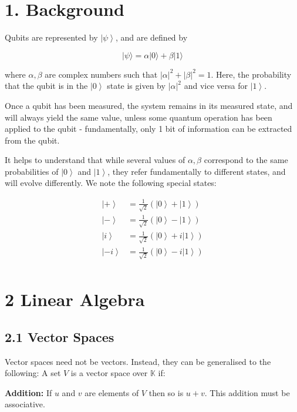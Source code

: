 \documentclass[10pt,oneside,a4paper]{article}
\newcommand{\qb}[1]{\left| #1 \right\rangle}
\begin{document}

\section*{1. Background}

Qubits are represented by $ \qb{\psi} $, and are defined by 

\[ 
    | \psi \rangle = \alpha | 0 \rangle + \beta | 1 \rangle
\]

where $\alpha, \beta$ are complex numbers such that $|\alpha|^2 + |\beta|^2 = 1$. Here, the probability that the qubit is in the $\qb{0}$ state is given by $|\alpha|^2$ and vice versa for $\qb{1}$. 

Once a qubit has been measured, the system remains in its measured state, and will always yield the same value, unless some quantum operation has been applied to the qubit - fundamentally, only 1 bit of information can be extracted from the qubit. 

It helps to understand that while several values of $\alpha, \beta$ correspond to the same probabilities of $\qb{0}$ and $\qb{1}$, they refer fundamentally to different states, and will evolve differently. We note the following special states: 

\[
    \begin{aligned}
        \qb{+} &= \frac{1}{\sqrt{2}} (\qb{0} + \qb{1}) \\
        \qb{-} &= \frac{1}{\sqrt{2}} (\qb{0} - \qb{1}) \\
        \qb{i} &= \frac{1}{\sqrt{2}} (\qb{0} + i\qb{1}) \\
        \qb{-i} &= \frac{1}{\sqrt{2}} (\qb{0} - i\qb{1}) \\
    \end{aligned}
\]


\section*{2 Linear Algebra}

\subsection*{2.1 Vector Spaces}

Vector spaces need not be vectors. Instead, they can be generalised to the following: A set $V$ is a vector space over $\mathbb{K}$ if: 


\textbf{Addition: } If $u$ and $v$ are elements of $V$ then so is $u + v$. This addition must be associative. 
\end{document}
